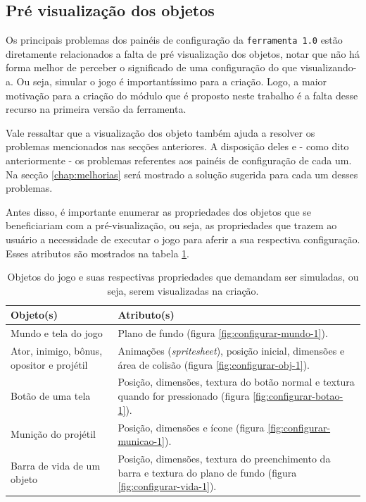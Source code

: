\documentclass[12pt,twoside,openright,a4paper,english,brazil,sumario=tradicional]{abntex2}
\begin{document}
\subsection{Pré visualização dos objetos}
\label{sec:previa-objetos}
Os principais problemas dos painéis de configuração da \texttt{ferramenta 1.0} estão diretamente relacionados a falta de pré visualização dos objetos, notar que não há forma melhor de perceber o significado de uma configuração do que visualizando-a. Ou seja, simular o jogo é importantíssimo para a criação. Logo, a maior motivação para a criação do módulo que é proposto neste trabalho é a falta desse recurso na primeira versão da ferramenta.

Vale ressaltar que a visualização dos objeto também ajuda a resolver os problemas mencionados nas secções anteriores. A disposição deles e - como dito anteriormente - os problemas referentes aos painéis de configuração de cada um. Na secção \ref{chap:melhorias} será mostrado a solução sugerida para cada um desses problemas.

Antes disso, é importante enumerar as propriedades dos objetos que se beneficiariam com a pré-visualização, ou seja, as propriedades que trazem ao usuário a necessidade de executar o jogo para aferir a sua respectiva configuração. Esses atributos são mostrados na tabela \ref{table:objetos-atributos}.

\begin{table}[h]
   \centering
   \begin{tabular}{| p{6cm} | p{9cm} |}
      \hline
      \textbf{Objeto(s)} & \textbf{Atributo(s)} \\
      \hline
      Mundo e tela do jogo & Plano de fundo (figura \ref{fig:configurar-mundo-1}).\\
      \hline
      Ator, inimigo, bônus, opositor e projétil & Animações (\emph{spritesheet}), posição inicial, dimensões e área de colisão (figura \ref{fig:configurar-obj-1}). \\
      \hline
      Botão de uma tela & Posição, dimensões, textura do botão normal e textura quando for pressionado (figura \ref{fig:configurar-botao-1}).\\
      \hline
      Munição do projétil & Posição, dimensões e ícone (figura \ref{fig:configurar-municao-1}). \\
      \hline
      Barra de vida de um objeto & Posição, dimensões, textura do preenchimento da barra e textura do plano de fundo (figura \ref{fig:configurar-vida-1}). \\
      \hline
   \end{tabular}
   \caption{Objetos do jogo e suas respectivas propriedades que demandam ser simuladas, ou seja, serem visualizadas na criação.}
   \label{table:objetos-atributos}
\end{table}
\end{document}
